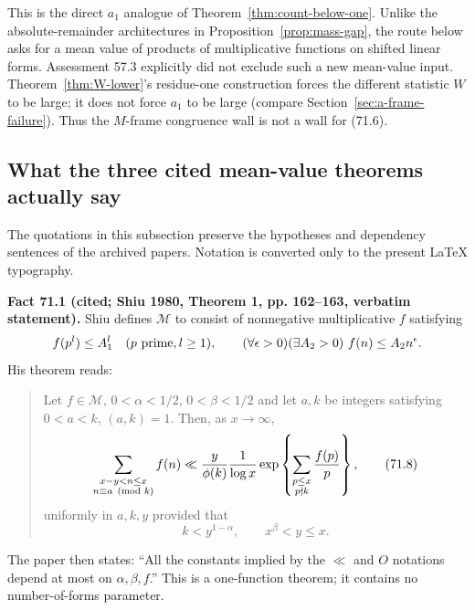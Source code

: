 \documentclass[10pt,reqno]{amsart}
\theoremstyle{definition}
\newcommand{\1}{\mathbf 1}
\begin{document}
This is the direct $a_1$ analogue of Theorem~\ref{thm:count-below-one}.  Unlike the
absolute-remainder architectures in Proposition~\ref{prop:mass-gap}, the route below asks
for a mean value of products of multiplicative functions on shifted linear
forms.  Assessment 57.3 explicitly did not exclude such a new mean-value
input.  Theorem~\ref{thm:W-lower}'s residue-one construction forces the different
statistic $W$ to be large; it does not force $a_1$ to be large (compare
Section~\ref{sec:a-frame-failure}).  Thus the $M$-frame congruence wall is not a wall for (71.6).

\subsection{What the three cited mean-value theorems actually say}

The quotations in this subsection preserve the hypotheses and dependency
sentences of the archived papers.  Notation is converted only to the present
LaTeX typography.

\medskip\noindent\textbf{Fact 71.1 (cited; Shiu 1980, Theorem 1, pp. 162--163, verbatim
statement).}  Shiu defines $\mathcal M$ to consist of nonnegative
multiplicative $f$ satisfying
\[
 f(p^l)\leq A_1^l\quad(p\ {\rm prime},l\geq1),\qquad
 (\forall\epsilon>0)(\exists A_2>0)\ f(n)\leq A_2n^\epsilon.
\]
His theorem reads:

\begin{quote}
Let $f\in\mathcal M$, $0<\alpha<1/2$, $0<\beta<1/2$ and let
$a,k$ be integers satisfying $0<a<k$, $(a,k)=1$.  Then, as
$x\to\infty$,
\begin{equation}
\sum_{\substack{x-y<n\leq x\\n\equiv a\pmod k}}f(n)
\ll {y\over\phi(k)}{1\over\log x}
\exp\left\{\sum_{\substack{p\leq x\\p\nmid k}}{f(p)\over p}\right\},
\tag{71.8}
\end{equation}
uniformly in $a,k,y$ provided that
\[
k<y^{1-\alpha},\qquad x^\beta<y\leq x.
\]
\end{quote}

The paper then states: ``All the constants implied by the $\ll$ and
$O$ notations depend at most on $\alpha,\beta,f$.''  This is a
one-function theorem; it contains no number-of-forms parameter.
\end{document}
